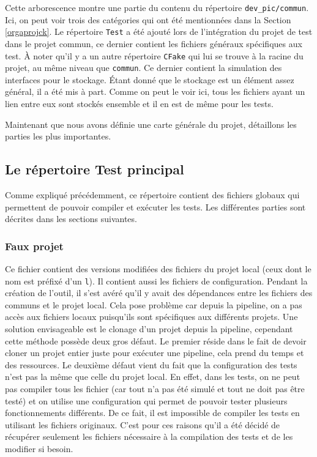 \documentclass[a4paper]{article}
\begin{document}
Cette arborescence montre une partie du contenu du répertoire
\verb|dev_pic/commun|. Ici, on peut voir trois des catégories qui ont été
mentionnées dans la Section \ref{orgaprojck}. Le répertoire \verb|Test| a été
ajouté lors de l'intégration du projet de test dans le projet commun, ce dernier
contient les fichiers généraux spécifiques aux test. À noter qu'il y a un autre
répertoire \verb|CFake| qui lui se trouve à la racine du projet, au même niveau
que \verb|commun|. Ce dernier contient la simulation des interfaces pour le
stockage. Étant donné que le stockage est un élément assez général, il a été mis
à part. Comme on peut le voir ici, tous les fichiers ayant un lien entre eux
sont stockés ensemble et il en est de même pour les tests.

Maintenant que nous avons définie une carte générale du projet, détaillons les
parties les plus importantes.

\subsection{Le répertoire Test principal}

Comme expliqué précédemment, ce répertoire contient des fichiers globaux
qui permettent de pouvoir compiler et exécuter les tests. Les différentes
parties sont décrites dans les sections suivantes.

\subsubsection*{Faux projet} %
\label{fakeproj}

Ce fichier contient des versions modifiées des fichiers du projet local (ceux
dont le nom est préfixé d'un \verb|l|). Il contient aussi les fichiers de
configuration. Pendant la création de l'outil, il s'est avéré qu'il y avait des
dépendances entre les fichiers des communs et le projet local. Cela pose
problème car depuis la pipeline, on a pas accès aux fichiers locaux puisqu'ils
sont spécifiques aux différents projets. Une solution envisageable est le
clonage d'un projet depuis la pipeline, cependant cette méthode possède deux
gros défaut. Le premier réside dans le fait de devoir cloner un projet entier
juste pour exécuter une pipeline, cela prend du temps et des ressources. Le
deuxième défaut vient du fait que la configuration des tests n'est pas la même
que celle du projet local. En effet, dans les tests, on ne peut pas compiler
tous les fichier (car tout n'a pas été simulé et tout ne doit pas être testé) et
on utilise une configuration qui permet de pouvoir tester plusieurs
fonctionnements différents. De ce fait, il est impossible de compiler les tests
en utilisant les fichiers originaux. C'est pour ces raisons qu'il a été décidé
de récupérer seulement les fichiers nécessaire à la compilation des tests et de
les modifier si besoin.
\end{document}
